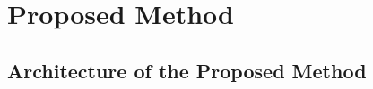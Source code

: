 \documentclass[8pt, aspectratio=169]{beamer}
\begin{document}

\section{Proposed Method}

\subsection{Architecture of the Proposed Method}
\end{document}

